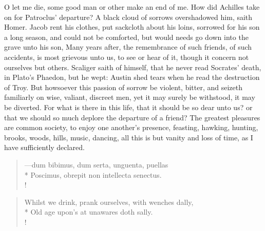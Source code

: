 {O let me die, some good man or other make an end of me. How did Achilles take on for Patroclus' departure? A black cloud of sorrows overshadowed him, saith Homer. Jacob rent his clothes, put sackcloth about his loins, sorrowed for his son a long season, and could not be comforted, but would needs go down into the grave unto his son,  Many years after, the remembrance of such friends, of such accidents, is most grievous unto us, to see or hear of it, though it concern not ourselves but others. Scaliger saith of himself, that he never read Socrates' death, in Plato's Phaedon, but he wept: Austin shed tears when he read the destruction of Troy. But howsoever this passion of sorrow be violent, bitter, and seizeth familiarly on wise, valiant, discreet men, yet it may surely be withstood, it may be diverted. For what is there in this life, that it should be so dear unto us? or that we should so much deplore the departure of a friend? The greatest pleasures are common society, to enjoy one another's presence, feasting, hawking, hunting, brooks, woods, hills, music, dancing, \etc{} all this is but vanity and loss of time, as I have sufficiently declared.

%
\begin{latin}%
\begin{verse}%
---dum bibimus, dum serta, unguenta, puellas\\*
Poscimus, obrepit non intellecta senectus.\\!
\end{verse}%
\translationrule%
\end{latin}%
\begin{verse}%
Whilst we drink, prank ourselves, with wenches dally,\\*
Old age upon's at unawares doth sally.\\!
\end{verse}%

}

